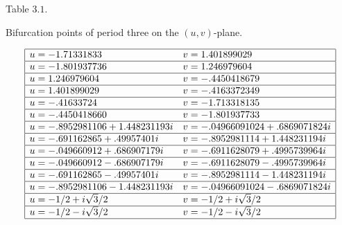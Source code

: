 \documentclass[12pt,a4paper]{amsart}
\numberwithin{equation}{section}
\numberwithin{lause}{section}
\begin{document}
\begin{table}[h]
\begin{center}
Table $3.1$.
\end{center}
\begin{center}
 Bifurcation points of period three on the $(u,v)$-plane.
\end{center}
\begin{displaymath}
\begin{array}{|ll|}
   \hline
  u = -1.71331833 & v = 1.401899029 \\\hline  u = -1.801937736 & v = 1.246979604  \\\hline  u = 1.246979604 & v = -.4450418679 \\\hline u = 1.401899029 & v = -.4163372349 \\\hline  u = -.41633724 & v = -1.713318135 \\\hline  u = -.4450418660 & v = -1.801937733  \\\hline u = -.8952981106+1.448231193i & v = -.04966091024+.6869071824i \\\hline u = -.691162865+.49957401i &  v = -.8952981114+1.448231194i \\\hline u = -.049660912+.686907179i & v = -.6911628079+.4995739964i \\\hline  u = -.049660912-.686907179i & v = -.6911628079-.4995739964i \\\hline u = -.691162865-.49957401i & v = -.8952981114-1.448231194i \\\hline u = -.8952981106-1.448231193i & v = -.04966091024-.6869071824i  \\\hline u = -1/2+i\sqrt{3}/2 & v = -1/2+i\sqrt{3}/2 \\\hline
  u = -1/2-i\sqrt{3}/2 & v = -1/2-i\sqrt{3}/2 \\\hline
\end{array}
\end{displaymath}
\end{table}
   
 
 
\end{document}
